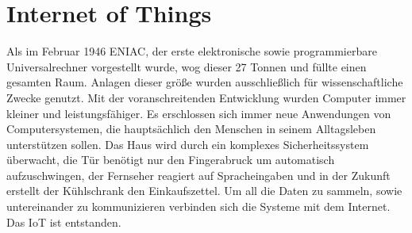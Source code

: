 \chapter{Internet of Things}\label{c:IoT}

Als im Februar 1946 ENIAC, der erste elektronische sowie programmierbare Universalrechner vorgestellt wurde, wog dieser 27 Tonnen und füllte einen gesamten Raum. Anlagen dieser größe wurden ausschließlich für wissenschaftliche Zwecke genutzt.
Mit der voranschreitenden Entwicklung wurden Computer immer kleiner und leistungsfähiger. Es erschlossen sich immer neue Anwendungen von Computersystemen, die hauptsächlich den Menschen in seinem Alltagsleben unterstützen sollen.
Das Haus wird durch ein komplexes Sicherheitssystem überwacht, die Tür benötigt nur den Fingerabruck um automatisch aufzuschwingen, der Fernseher reagiert auf Spracheingaben und in der Zukunft erstellt der Kühlschrank den Einkaufszettel.
Um all die Daten zu sammeln, sowie untereinander zu kommunizieren verbinden sich die Systeme mit dem Internet. 
Das IoT ist entstanden.

